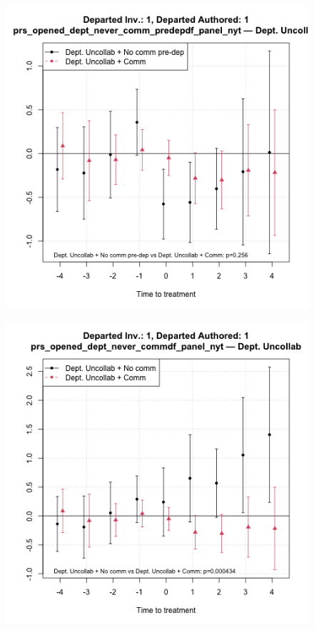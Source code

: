 \begin{figure}[htbp]
    \begin{minipage}[b]{0.24\textwidth}
    \centering
    \includegraphics[width=\textwidth]{temp/output/collab_imp/auth_n1_inv_n1_cs_norm_prs_opened_dept_never_comm_predep_Dept.Uncollab.png}
    \label{fig:prs_opened_comm_uncollab_nonint_predep}
    \end{minipage}
    \hfill
    \begin{minipage}[b]{0.24\textwidth}
        \centering
        \includegraphics[width=\textwidth]{temp/output/collab_imp/auth_n1_inv_n1_cs_norm_prs_opened_dept_never_comm_Dept.Uncollab.png}

\end{minipage}
\end{figure}
